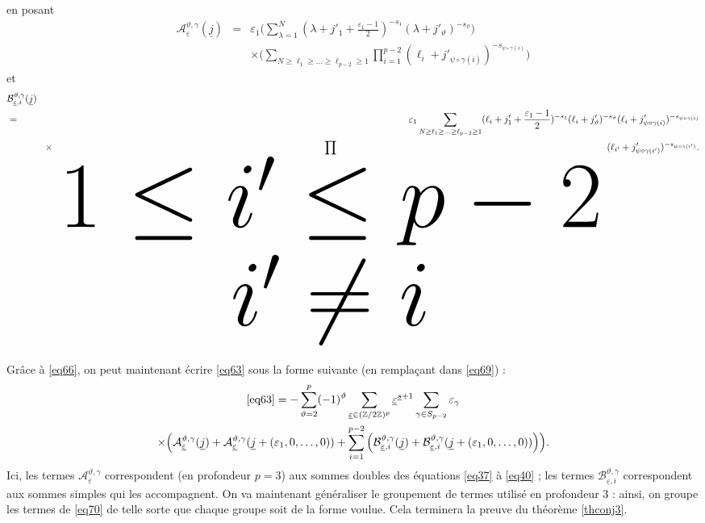 \documentclass[12pt,francais, reqno]{smfart}
\numberwithin{equation}{section}
\def\lam{\lambda}
\newcommand{\Z}{\mathbb Z}
\newcommand{\indso}[2]{{\tiny {\begin{array}{c} #1 \\ #2 \end{array}}}}
\newcommand{\sppmd}{{\mathfrak S}_{p-2}}
\newcommand{\zdzp}{(\Z / 2 \Z)^p}
\newcommand{\eps}{\varepsilon}
\newcommand{\epssoul}{\underline{\eps}}
\newcommand{\jsoul}{\underline{j}}
\newcommand{\jtisoul}{\underline{j} + (\eps_1, 0, \ldots, 0)}
\newcommand{\ssoul}{\underline{s}}
\newcommand{\jprun}{j'_1+\frac{\eps_1-1}{2}}
\newcommand{\astgj}{{\mathcal A}_{\epssoul} ^{\teta, \gamma} (\jsoul)}
\newcommand{\astgseul}{{\mathcal A}_{\epssoul} ^{\teta, \gamma}  }
\newcommand{\astgjti}{{\mathcal A}_{\epssoul} ^{\teta, \gamma} (\jtisoul)}
\newcommand{\bstgj}{{\mathcal B}_{\epssoul, i} ^{\teta, \gamma} (\jsoul)}
\newcommand{\bstgjti}{{\mathcal B}_{\epssoul, i} ^{\teta, \gamma} (\jtisoul)}
\newcommand{\bstgseul}{{\mathcal B}_{\epssoul, i} ^{\teta, \gamma}  }
\newcommand{\teta}{\vartheta}
\newcommand{\psii}{\psi}
\begin{document}
en posant 
\begin{eqnarray} 
\astgj & = &  \eps_1 
\Big( \sum_{\lam = 1}^N (\lam +\jprun)^{-s_1}  (\lam + j'_{\teta})^{-s_{\teta}}  \Big) \label{eq67} \\
&& \times \Big(    \sum_{N \geq \ell_1 \geq \ldots  \geq \ell_{p-2}  \geq 1}
\prod_{i=1} ^{p-2} (\ell_i+j'_{\psii \circ \gamma (i)})^{-s_{\psii \circ \gamma (i)}} \Big)     \nonumber
\end{eqnarray} 
et
\begin{eqnarray} 
\lefteqn{\bstgj}  \nonumber 
\\&=&   \eps_1   \sum_{N \geq \ell_1 \geq \ldots  \geq \ell_{p-2}  \geq 1}
(\ell_i +\jprun)^{-s_1}  (\ell_i + j'_{\teta})^{-s_{\teta}}   (\ell_i+j'_{\psii \circ \gamma (i)})^{-s_{\psii \circ \gamma (i)}}   \label{eq68} \\
&& \quad \quad \times   \prod_\indso{1 \leq i' \leq p-2}{i' \neq i}      (\ell_{i'}+j'_{\psii \circ \gamma (i')})^{-s_{\psii \circ \gamma (i')}}  .   \nonumber
\end{eqnarray} 
Gr\^ace \`a \eqref{eq66}, on peut maintenant \'ecrire \eqref{eq63} sous la forme suivante (en rempla\c cant dans \eqref{eq69}) : 
\begin{multline}
\eqref{eq63} = - \sum_{\teta = 2} ^p (-1)^\teta 
 \sum_{\epssoul \in \zdzp} \epssoul ^{\ssoul + 1} 
 \sum_{\gamma \in \sppmd} \eps_\gamma  \label{eq70} \\
  \times   \Big( \astgj +  \astgjti +    \sum_{i=1}^{p-2}    \Big(  \bstgj + \bstgjti \Big)  \Big). 
\end{multline}
Ici, les termes $\astgseul$ correspondent (en profondeur $p= 3$) aux sommes doubles des \'equations \eqref{eq37} \`a \eqref{eq40} ; les termes $\bstgseul$ correspondent aux sommes simples qui les accompagnent. 
On va maintenant g\'en\'eraliser le groupement de termes utilis\'e en profondeur 3 : ainsi, on groupe  les termes de \eqref{eq70} de telle sorte que chaque groupe soit de la forme voulue. Cela terminera la preuve du th\'eor\`eme \ref{thconj3}. 

\bigskip
\end{document}
